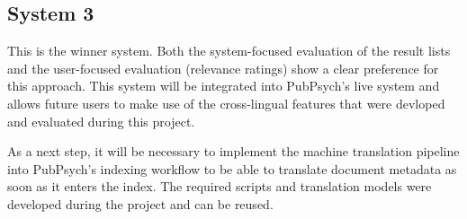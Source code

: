 \documentclass[a4paper,11pt]{article}
\begin{document}
\subsection{System 3}
This is the winner system. Both the system-focused evaluation of the result lists and the user-focused evaluation (relevance ratings) show a clear preference for this approach. This system will be integrated into PubPsych's live system and allows future users to make use of the cross-lingual features that were devloped and evaluated during this project. 

As a next step, it will be necessary to implement the machine translation pipeline into PubPsych's indexing workflow to be able to translate document metadata as soon as it enters the index. The required scripts and translation models were developed during the project and can be reused. 














\appendix
\end{document}
